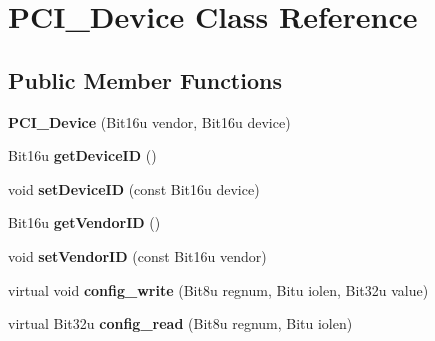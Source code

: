 \hypertarget{classPCI__Device}{\section{P\-C\-I\-\_\-\-Device Class Reference}
\label{classPCI__Device}
}
\subsection*{Public Member Functions}
\begin{DoxyCompactItemize}
\item 
\hypertarget{classPCI__Device_a3e88023ba031fe2137b1b83307d10139}{{\bfseries P\-C\-I\-\_\-\-Device} (Bit16u vendor, Bit16u device)}\label{classPCI__Device_a3e88023ba031fe2137b1b83307d10139}

\item 
\hypertarget{classPCI__Device_aeffcee3f3604817e13621fd0af3c116c}{Bit16u {\bfseries get\-Device\-I\-D} ()}\label{classPCI__Device_aeffcee3f3604817e13621fd0af3c116c}

\item 
\hypertarget{classPCI__Device_ae301eac6564171b8ebd631f1f5a5b010}{void {\bfseries set\-Device\-I\-D} (const Bit16u device)}\label{classPCI__Device_ae301eac6564171b8ebd631f1f5a5b010}

\item 
\hypertarget{classPCI__Device_a250d9180675cc1d1b95c9c3bbb98cbc6}{Bit16u {\bfseries get\-Vendor\-I\-D} ()}\label{classPCI__Device_a250d9180675cc1d1b95c9c3bbb98cbc6}

\item 
\hypertarget{classPCI__Device_a77e5dc350044cbcf1d4282bd0960e29f}{void {\bfseries set\-Vendor\-I\-D} (const Bit16u vendor)}\label{classPCI__Device_a77e5dc350044cbcf1d4282bd0960e29f}

\item 
\hypertarget{classPCI__Device_a61dff5e6d0d2a159eb85c7fdbab85544}{virtual void {\bfseries config\-\_\-write} (Bit8u regnum, Bitu iolen, Bit32u value)}\label{classPCI__Device_a61dff5e6d0d2a159eb85c7fdbab85544}

\item 
\hypertarget{classPCI__Device_aa3b02b458e4c1907f654e34166f0cb81}{virtual Bit32u {\bfseries config\-\_\-read} (Bit8u regnum, Bitu iolen)}\label{classPCI__Device_aa3b02b458e4c1907f654e34166f0cb81}

\end{DoxyCompactItemize}
